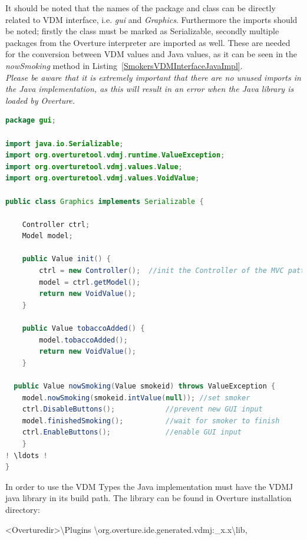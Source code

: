 \documentclass{overturerepchap}
\begin{document}
It should be noted that the names of the package and class can be directly related to VDM interface, i.e. \textit{gui} and \textit{Graphics}. Furthermore the imports should be noted; firstly the class must be marked as Serializable, secondly multiple packages from the Overture interpreter are imported as well. These are needed for the conversion between VDM values and Java values, as it can be seen in the \textit{nowSmoking} method in Listing~\ref{SmokersVDMInterfaceJavaImpl}. \\

\noindent \emph{Please be aware that it is extremely important that there are no unused imports in the Java implementation, as this will result in an error when the Java library is loaded by Overture.} \\
\vspace{1in}
\begin{lstlisting}[language=Java,label=SmokersVDMInterfaceJavaImpl,caption=Java implementation of the VDM interface for the external Java library,captionpos=b]
package gui; 

import java.io.Serializable;
import org.overturetool.vdmj.runtime.ValueException;
import org.overturetool.vdmj.values.Value;
import org.overturetool.vdmj.values.VoidValue;

public class Graphics implements Serializable {

    Controller ctrl;
    Model model;

    public Value init() {
    	ctrl = new Controller();  //init the Controller of the MVC pattern
    	model = ctrl.getModel();
        return new VoidValue();
    }

    public Value tobaccoAdded() {
        model.tobaccoAdded();
        return new VoidValue();
    }
    
  public Value nowSmoking(Value smokeid) throws ValueException {
	model.nowSmoking(smokeid.intValue(null)); //set smoker
	ctrl.DisableButtons(); 			  //prevent new GUI input
	model.finishedSmoking(); 		  //wait for smoker to finish
	ctrl.EnableButtons(); 			  //enable GUI input
    }
! \ldots !
}
\end{lstlisting}

In order to use the VDM Types the Java implementation must have the VDMJ java library in its build path. The library can be found in Overture installation directory:

 \textless  Overturedir\textgreater\textbackslash Plugins \textbackslash org.overture.ide.generated.vdmj:\_x.x\textbackslash lib, 
\end{document}
